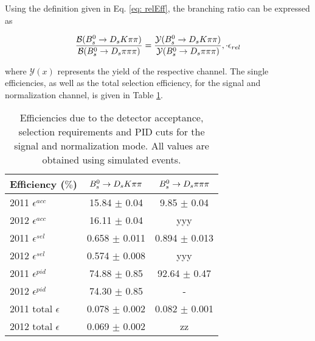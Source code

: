  Using the definition given in Eq. \ref{eq: relEff}, the branching ratio can be expressed as

\begin{equation}
\frac{\mathcal{B}({{B}^0_{s}}\rightarrow{\ensuremath{{D}_{s}}}{\ensuremath{K}}{\ensuremath{\pi}}{\ensuremath{\pi}})}{\mathcal{B}({{B}^0_{s}}\rightarrow{\ensuremath{{D}_{s}}}{\ensuremath{\pi}}{\ensuremath{\pi}}{\ensuremath{\pi}})} = \frac{\mathcal{Y}({{B}^0_{s}}\rightarrow{\ensuremath{{D}_{s}}}{\ensuremath{K}}{\ensuremath{\pi}}{\ensuremath{\pi}})}{\mathcal{Y}({{B}^0_{s}}\rightarrow{\ensuremath{{D}_{s}}}{\ensuremath{\pi}}{\ensuremath{\pi}}{\ensuremath{\pi}})},
\cdot \epsilon_{rel}
\label{eq: BRwEff}
\end{equation} 

where $\mathcal{Y}(x)$ represents the yield of the respective channel. \newline
The single efficiencies, as well as the total selection efficiency, for the signal and normalization channel, is given in Table \ref{tab: effTab}.

\begin{table}[h!]
\centering
\begin{tabular}{l c c}
Efficiency ($\%$) & ${{B}^0_{s}}\rightarrow{\ensuremath{{D}_{s}}}{\ensuremath{K}}{\ensuremath{\pi}}{\ensuremath{\pi}}$ & ${{B}^0_{s}}\rightarrow{\ensuremath{{D}_{s}}}{\ensuremath{\pi}}{\ensuremath{\pi}}{\ensuremath{\pi}}$\\
\hline
2011 $\epsilon^{acc}$ & 15.84 $\pm$ 0.04 & 9.85 $\pm$ 0.04\\
2012 $\epsilon^{acc}$ & 16.11 $\pm$ 0.04 & yyy\\
2011 $\epsilon^{sel}$ & 0.658 $\pm$ 0.011& 0.894 $\pm$ 0.013\\
2012 $\epsilon^{sel}$ & 0.574 $\pm$ 0.008& yyy\\
2011 $\epsilon^{pid}$ & 74.88 $\pm$ 0.85 & 92.64 $\pm$ 0.47\\
2012 $\epsilon^{pid}$ & 74.30 $\pm$ 0.85 & -\\
\hline
2011 total $\epsilon$ & 0.078 $\pm$  0.002& 0.082 $\pm$ 0.001\\
2012 total $\epsilon$ & 0.069 $\pm$  0.002& zz\\
\hline
\end{tabular}
\caption{Efficiencies due to the detector acceptance, selection requirements and PID cuts for the signal and normalization mode. All values are obtained using simulated events.}
\label{tab: effTab}
\end{table}





